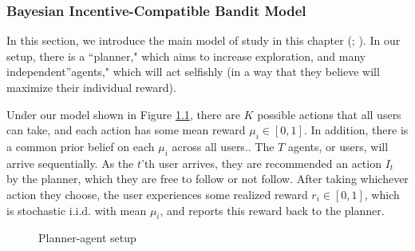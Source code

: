 \documentclass[
  letterpaper,
  numbers=noenddot,
  DIV=11]{scrreprt}
\theoremstyle{definition}
\theoremstyle{plain}
\theoremstyle{plain}
\theoremstyle{remark}
\begin{document}
\subsubsection*{Bayesian Incentive-Compatible Bandit
Model}\label{bayesian-incentive-compatible-bandit-model}

In this section, we introduce the main model of study in this chapter
(;
). In our setup, there is a ``planner," which aims to
increase exploration, and many independent''agents," which will act
selfishly (in a way that they believe will maximize their individual
reward).

Under our model shown in Figure \hyperref[fig-planner-agent]{1.1}, there
are \(K\) possible actions that all users can take, and each action has
some mean reward \(\mu_i \in [0, 1]\). In addition, there is a common
prior belief on each \(\mu_i\) across all users.. The \(T\) agents, or
users, will arrive sequentially. As the \(t\)'th user arrives, they are
recommended an action \(I_t\) by the planner, which they are free to
follow or not follow. After taking whichever action they choose, the
user experiences some realized reward \(r_i \in [0, 1]\), which is
stochastic i.i.d. with mean \(\mu_i\), and reports this reward back to
the planner.

\begin{figure}


\caption{\label{fig-planner-agent}Planner-agent setup}

\end{figure}%
\end{document}
